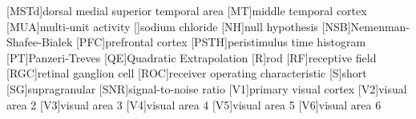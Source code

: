 \begin{acronym}[AUROC]
        [MSTd]{dorsal medial superior temporal area}
        [MT]{middle temporal cortex}
        [MUA]{multi-unit activity}
        []{sodium chloride}
        [NH]{null hypothesis}
        [NSB]{{N}emenman-{S}hafee-{B}ialek}
        [PFC]{prefrontal cortex}
        [PSTH]{peristimulus time histogram}
        [PT]{{P}anzeri-{T}reves}
        [QE]{Quadratic Extrapolation}
        [R]{rod}
        [RF]{receptive field}
        [RGC]{retinal ganglion cell}
        [ROC]{receiver operating characteristic}
        [S]{short}
        [SG]{supragranular}
        [SNR]{signal-to-noise ratio}
        [V1]{primary visual cortex}
        [V2]{visual area 2}
        [V3]{visual area 3}
        [V4]{visual area 4}
        [V5]{visual area 5}
        [V6]{visual area 6}
    \end{acronym}                     
\endgroup

\cleardoublepage
